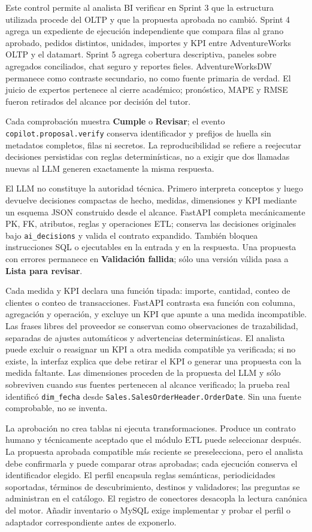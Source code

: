 \documentclass[11pt,letterpaper]{article}
\newcommand{\file}[1]{\texttt{#1}}
\begin{document}
Este control permite al analista BI verificar en Sprint 3 que la estructura utilizada procede del OLTP y que la propuesta aprobada no cambió. Sprint 4 agrega un expediente de ejecución independiente que compara filas al grano aprobado, pedidos distintos, unidades, importes y KPI entre AdventureWorks OLTP y el datamart. Sprint 5 agrega cobertura descriptiva, paneles sobre agregados conciliados, chat seguro y reportes fieles. AdventureWorksDW permanece como contraste secundario, no como fuente primaria de verdad. El juicio de expertos pertenece al cierre académico; pronóstico, MAPE y RMSE fueron retirados del alcance por decisión del tutor.

Cada comprobación muestra \textbf{Cumple} o \textbf{Revisar}; el evento \file{copilot.proposal.verify} conserva identificador y prefijos de huella sin metadatos completos, filas ni secretos. La reproducibilidad se refiere a reejecutar decisiones persistidas con reglas determinísticas, no a exigir que dos llamadas nuevas al LLM generen exactamente la misma respuesta.

El LLM no constituye la autoridad técnica. Primero interpreta conceptos y luego devuelve decisiones compactas de hecho, medidas, dimensiones y KPI mediante un esquema JSON construido desde el alcance. FastAPI completa mecánicamente PK, FK, atributos, reglas y operaciones ETL; conserva las decisiones originales bajo \file{ai\_decisions} y valida el contrato expandido. También bloquea instrucciones SQL o ejecutables en la entrada y en la respuesta. Una propuesta con errores permanece en \textbf{Validación fallida}; sólo una versión válida pasa a \textbf{Lista para revisar}.

Cada medida y KPI declara una función tipada: importe, cantidad, conteo de clientes o conteo de transacciones. FastAPI contrasta esa función con columna, agregación y operación, y excluye un KPI que apunte a una medida incompatible. Las frases libres del proveedor se conservan como observaciones de trazabilidad, separadas de ajustes automáticos y advertencias determinísticas. El analista puede excluir o reasignar un KPI a otra medida compatible ya verificada; si no existe, la interfaz explica que debe retirar el KPI o generar una propuesta con la medida faltante. Las dimensiones proceden de la propuesta del LLM y sólo sobreviven cuando sus fuentes pertenecen al alcance verificado; la prueba real identificó \file{dim\_fecha} desde \file{Sales.SalesOrderHeader.OrderDate}. Sin una fuente comprobable, no se inventa.

La aprobación no crea tablas ni ejecuta transformaciones. Produce un contrato humano y técnicamente aceptado que el módulo ETL puede seleccionar después. La propuesta aprobada compatible más reciente se preselecciona, pero el analista debe confirmarla y puede comparar otras aprobadas; cada ejecución conserva el identificador elegido. El perfil  encapsula reglas semánticas, periodicidades soportadas, términos de descubrimiento, destinos y validadores; las preguntas se administran en el catálogo. El registro de conectores desacopla la lectura canónica del motor. Añadir inventario o MySQL exige implementar y probar el perfil o adaptador correspondiente antes de exponerlo.
\end{document}

